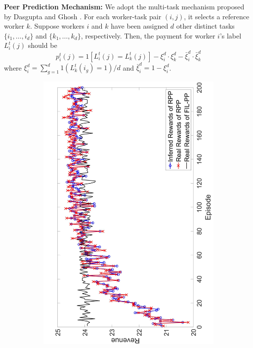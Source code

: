 \documentclass[letterpaper]{article} %
\begin{document}
\noindent \textbf{Peer Prediction Mechanism:} We adopt the multi-task mechanism proposed by Dasgupta and Ghosh .  For each worker-task pair $(i, j)$, it selects a reference worker $k$. Suppose workers $i$ and $k$ have been assigned $d$ other distinct tasks $\{i_1,\ldots,i_d\}$ and $\{k_1,\ldots, k_d\}$, respectively. Then, the payment for worker $i$'s label $L^t_i(j)$ should be
\begin{equation}
p^t_{i}(j)= 1[L^{t}_i(j)=L^{t}_k(j)]- \xi_{i}^d\cdot \xi_{k}^d -\bar{\xi}_{i}^d\cdot \bar{\xi}_{k}^d
\end{equation}
where $\xi_{i}^{d}=\sum_{g=1}^{d}1(L^{t}_k(i_g)=1)/d$ and $\bar{\xi}_{i}^{d}=1-\xi_{i}^{d}$.

\begin{figure}[htb]
    \centering
    \begin{subfigure}[t]{0.3\textwidth}
        \centering
        \includegraphics[width=\textwidth]{image/1}

\end{subfigure}
\end{figure}
\end{document}
